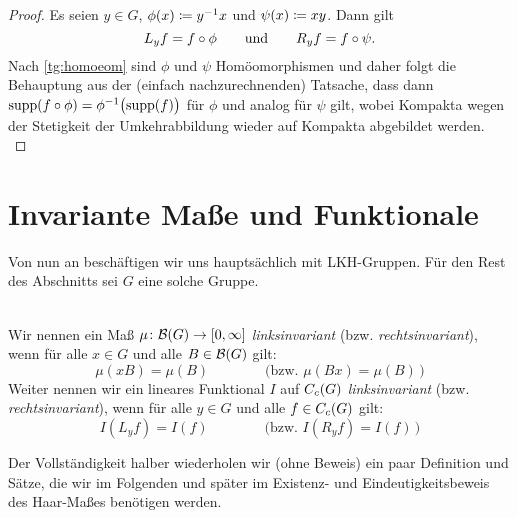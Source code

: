 \begin{proof}
    Es seien $y\in G$,
    $\phi(x) \coloneqq y^{-1}x$ und $\psi(x) \coloneqq xy$.
    Dann gilt
    \[  L_y f = f \circ \phi 
        \qquad\text{und}\qquad
        R_y f = f \circ \psi
    . \]
    Nach \cref{tg:homoeom} sind $\phi$ und $\psi$ Homöomorphismen und daher
    folgt die Behauptung aus der (einfach nachzurechnenden) Tatsache, dass dann
    $\operatorname{supp}(f\circ\phi) = \phi^{-1}\bigl(\operatorname{supp}(f)\bigr)$ für $\phi$ und analog 
    für $\psi$ gilt, wobei Kompakta wegen der Stetigkeit der Umkehrabbildung wieder auf
    Kompakta abgebildet werden.
    \\
\end{proof}


\section{Invariante Maße und Funktionale}
Von nun an beschäftigen wir uns hauptsächlich mit LKH-Gruppen. Für den Rest des
Abschnitts sei $G$ eine solche Gruppe.

\begin{thDef}\hfill\\
    Wir nennen ein Maß $\mu\colon \mathcal{B}(G) \to [0,\infty]$
    \emph{linksinvariant} (bzw. \emph{rechtsinvariant}), 
    wenn für alle $x\in G$ und alle $B\in\mathcal{B}(G)$ gilt:
    \[  \mu(xB) = \mu(B)
        \qquad\qquad\bigl(\text{bzw. } 
        \mu(Bx) = \mu(B) 
        \,\bigr)
    \]
    Weiter nennen wir ein lineares Funktional $I$ auf $C_c(G)$ 
    \emph{linksinvariant} (bzw. \emph{rechtsinvariant}),
    wenn für alle $y\in G$ und alle $f\in C_c(G)$ gilt:
    \[  I(L_yf) = I(f) 
        \qquad\qquad\bigl(\text{bzw. } 
        I(R_yf) = I(f)
        \,\bigr)
    \]
\end{thDef}

\medskip
Der Vollständigkeit halber wiederholen wir (ohne Beweis) 
ein paar Definition und Sätze, die wir im Folgenden und später im Existenz- und
Eindeutigkeitsbeweis des Haar-Maßes  benötigen werden.

